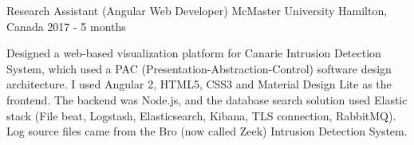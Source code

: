 \begin{cventries}
	



  \cventry
{Research Assistant (Angular Web Developer)} %
{McMaster University} %
{Hamilton, Canada} %
{2017 - 5 months} %
{\vspace{1.0mm}
	\begin{cvitems}
		\item
		{Designed a web-based visualization platform for Canarie Intrusion Detection System, which used a PAC (Presentation-Abstraction-Control) software design architecture. I used Angular 2, HTML5, CSS3 and Material Design Lite as the frontend. The backend was Node.js, and the database search solution used Elastic stack (File beat, Logstash, Elasticsearch, Kibana, TLS connection, RabbitMQ). Log source files came from the Bro (now called Zeek) Intrusion Detection System.}
	\end{cvitems}
}


\end{cventries}
